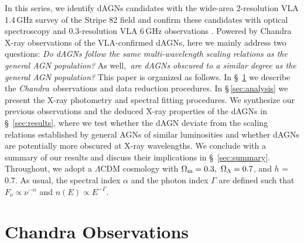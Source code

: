 \documentclass[iop,revtex4,twocolumn,apj,numberedappendix,appendixfloats]{emulateapj}
\newcommand{\chandra}{{\it Chandra}}
\begin{document}
In this series, we identify dAGNs candidates with the wide-area 2\arcsec-resolution VLA 1.4\,GHz survey of the Stripe 82 field \citep[][hereafter ]{Fu15a} and confirm these candidates with optical spectroscopy and 0.3\arcsec-resolution VLA 6\,GHz observations \citep[][hereafter ]{Fu15b}. Powered by Chandra X-ray observations of the VLA-confirmed dAGNs, here we mainly address two questions: {\it Do dAGNs follow the same multi-wavelength scaling relations as the general AGN population?} As well,{\it \, are dAGNs obscured to a similar degree as the general AGN population?} 
%
This paper is organized as follows. In \S~\ref{sec:obs} we describe the \chandra\ observations and data reduction procedures. In \S\,\ref{sec:analysis} we present the X-ray photometry and spectral fitting procedures. We synthesize our previous observations and the deduced X-ray properties of the dAGNs in \S~\ref{sec:results}, where we test whether the dAGN deviate from the scaling relations established by general AGNs of similar luminosities and whether dAGNs are potentially more obscured at X-ray wavelengths.  
We conclude with a summary of our results and discuss their implications in \S~\ref{sec:summary}.
%
Throughout, we adopt a $\Lambda$CDM cosmology with $\Omega_{\rm m} = 0.3, \ \Omega_{\Lambda} = 0.7$, and $h$ = 0.7. As usual, the spectral index $\alpha$ and the photon index $\Gamma$ are defined such that $F_\nu \propto \nu^{-\alpha}$ and $n(E) \propto E^{-\Gamma}$.


\section{Chandra Observations} \label{sec:obs}
\end{document}

